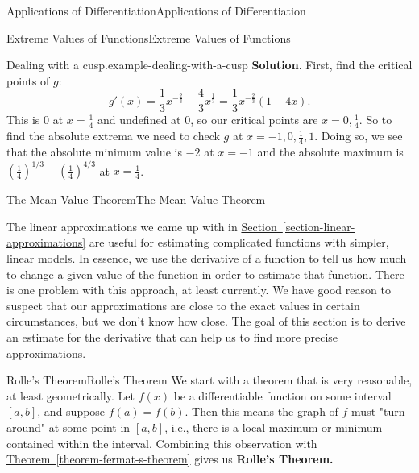 \documentclass[10pt,]{book}
\newcommand{\terminology}[1]{\textbf{#1}}
\numberwithin{equation}{section}
\begin{document}
\begin{chapterptx}{Applications of Differentiation}{}{Applications of Differentiation}{}{}
\begin{sectionptx}{Extreme Values of Functions}{}{Extreme Values of Functions}{}{}
\begin{example}{Dealing with a cusp.}{example-dealing-with-a-cusp}
\noindent\textbf{Solution}.\hypertarget{solution-72}{}\quad%
\hypertarget{p-327}{}%
First, find the critical points of \(g\):%
\begin{equation*}
g'(x) = \frac{1}{3}x^{-\frac{2}{3}} - \frac{4}{3}x^{\frac{1}{3}} = \frac{1}{3}x^{-\frac{2}{3}}(1 - 4x).
\end{equation*}
This is \(0\) at \(x = \frac{1}{4}\) and undefined at \(0\), so our critical points are \(x=0,\frac{1}{4}\). So to find the absolute extrema we need to check \(g\) at \(x=-1,0,\frac{1}{4},1\). Doing so, we see that the absolute minimum value is \(-2\) at \(x=-1\) and the absolute maximum is \((\frac{1}{4})^{1/3} - (\frac{1}{4})^{4/3}\) at \(x = \frac{1}{4}\).%
\end{example}
\end{sectionptx}
%
%
\typeout{************************************************}
\typeout{************************************************}
%
\begin{sectionptx}{The Mean Value Theorem}{}{The Mean Value Theorem}{}{}\label{section-the-mean-value-theorem}
\begin{introduction}{}%
\hypertarget{p-328}{}%
The linear approximations we came up with in \hyperref[section-linear-approximations]{Section~\ref{section-linear-approximations}} are useful for estimating complicated functions with simpler, linear models. In essence, we use the derivative of a function to tell us how much to change a given value of the function in order to estimate that function. There is one problem with this approach, at least currently. We have good reason to suspect that our approximations are close to the exact values in certain circumstances, but we don't know how close. The goal of this section is to derive an estimate for the derivative that can help us to find more precise approximations.%
\end{introduction}%
%
%
\typeout{************************************************}
\typeout{************************************************}
%
\begin{subsectionptx}{Rolle's Theorem}{}{Rolle's Theorem}{}{}\label{subsection-rolle-s-theorem}
\hypertarget{p-329}{}%
We start with a theorem that is very reasonable, at least geometrically. Let \(f(x)\) be a differentiable function on some interval \([a,b]\), and suppose \(f(a) = f(b)\). Then this means the graph of \(f\) must "turn around" at some point in \([a,b]\), i.e., there is a local maximum or minimum contained within the interval. Combining this observation with \hyperref[theorem-fermat-s-theorem]{Theorem~\ref{theorem-fermat-s-theorem}} gives us \terminology{Rolle's Theorem.}%

\end{subsectionptx}
\end{sectionptx}
\end{chapterptx}
\end{document}
